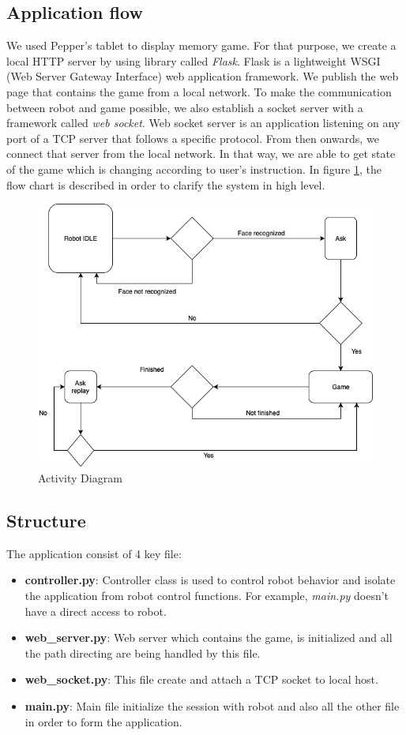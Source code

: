 \documentclass[12pt]{article}
\begin{document}
\subsection{Application flow}
We used Pepper's tablet to display memory game. For that purpose, we create a local HTTP server by using library called \textit{Flask}. Flask is a lightweight WSGI (Web Server Gateway Interface) web application framework. We publish the web page that contains the game from a local network. To make the communication between robot and game possible, we also establish a socket server with a framework called \textit{web socket}. Web socket server is an application listening on any port of a TCP server that follows a specific protocol. From then onwards,  we connect that server from the local network. In that way, we are able to get state of the game which is changing according to user's instruction. In figure \ref{fig:diagram}, the flow chart is described in order to clarify the system in high level.
\begin{figure}[H]
\centering
\includegraphics[scale=0.5]{images/flow.png}
\caption{Activity Diagram}
\label{fig:diagram}
\end{figure}
\subsection{Structure}
The application consist of 4 key file:
\begin{itemize}
\item \textbf{controller.py}: Controller class is used to control robot behavior and isolate the application from robot control functions. For example, \textit{main.py} doesn't have a direct access to robot.
\item \textbf{web\_server.py}: Web server which contains the game, is initialized and all the path directing are being handled by this file.
\item \textbf{web\_socket.py}: This file create and attach a TCP socket to local host.
\item \textbf{main.py}: Main file initialize the session with robot and also all the other file in order to form the application.
\end{itemize}
\end{document}
